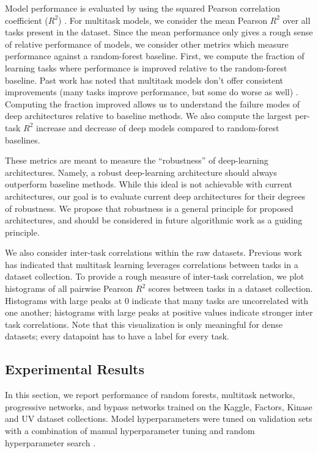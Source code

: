 Model performance is evaluated by using the squared Pearson correlation coefficient ($R^2$) \cite{ma2015deep}. For multitask models, we consider the mean Pearson $R^2$ over all tasks present in the dataset. Since the mean performance only gives a rough sense of relative performance of models, we consider other metrics which measure performance against a random-forest baseline. First, we compute the fraction of learning tasks where performance is improved relative to the random-forest baseline. Past work has noted that multitask models don't offer consistent improvements (many tasks improve performance, but some do worse as well) \cite{ramsundar2015massively}. Computing the fraction improved allows us to understand the failure modes of deep architectures relative to baseline methods. We also compute the largest per-task $R^2$ increase and decrease of deep models compared to random-forest baselines.

These metrics are meant to measure the ``robustness'' of deep-learning architectures. Namely, a robust deep-learning architecture should always outperform baseline methods. While this ideal is not achievable with current architectures, our goal is to evaluate current deep architectures for their degrees of robustness. We propose that robustness is a general principle for proposed architectures, and should be considered in future algorithmic work as a guiding principle.

We also consider inter-task correlations within the raw datasets. Previous work has indicated that multitask learning leverages correlations between tasks in a dataset collection. To provide a rough measure of inter-task correlation, we plot histograms of all pairwise Pearson $R^2$ scores between tasks in a dataset collection. Histograms with large peaks at $0$ indicate that many tasks are uncorrelated with one another; histograms with large peaks at positive values indicate stronger inter task correlations. Note that this visualization is only meaningful for dense datasets; every datapoint has to have a label for every task.

\subsection{Experimental Results}

In this section, we report performance of random forests, multitask networks, progressive networks, and bypass networks trained on the Kaggle, Factors, Kinase and UV dataset collections. Model hyperparameters were tuned on validation sets with a combination of manual hyperparameter tuning and random hyperparameter search \cite{bergstra2012random}. 


